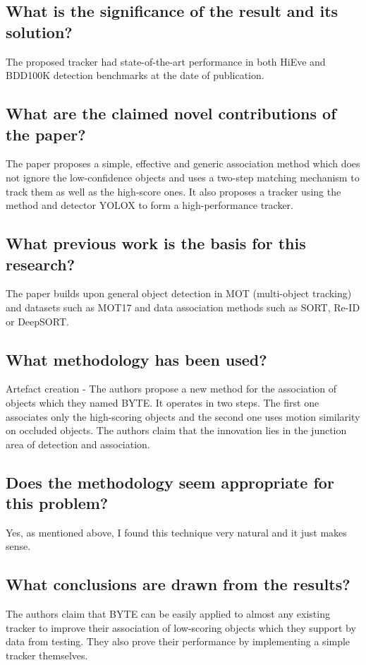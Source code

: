 \documentclass[11pt,a4paper]{article}
\begin{document}
\subsection*{What is the significance of the result and its solution?}
The proposed tracker had state-of-the-art performance in both HiEve and BDD100K detection benchmarks at the date of publication.
\subsection*{What are the claimed novel contributions of the paper?}
The paper proposes a simple, effective and generic association method which does not ignore the low-confidence objects and uses a two-step matching mechanism to track them as well as the high-score ones. It also proposes a tracker using the method and detector YOLOX to form a high-performance tracker.
\subsection*{What previous work is the basis for this research?}
The paper builds upon general object detection in MOT (multi-object tracking) and datasets such as MOT17 and data association methods such as SORT, Re-ID or DeepSORT.
\subsection*{What methodology has been used?}
Artefact creation - The authors propose a new method for the association of objects which they named BYTE. It operates in two steps. The first one associates only the high-scoring objects and the second one uses motion similarity on occluded objects. The authors claim that the innovation lies in the junction area of detection and association.
\subsection*{Does the methodology seem appropriate for this problem?}
Yes, as mentioned above, I found this technique very natural and it just makes sense.
\subsection*{What conclusions are drawn from the results?}
The authors claim that BYTE can be easily applied to almost any existing tracker to improve their association of low-scoring objects which they support by data from testing. They also prove their performance by implementing a simple tracker themselves.
\end{document}
